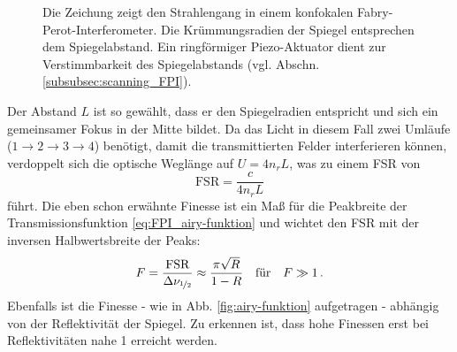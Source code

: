 \begin{figure}[h]
 	\centering
	\caption[FPI - konfokal]{Die Zeichung zeigt den Strahlengang in einem
	konfokalen Fabry-Perot-Interferometer. Die
	Krümmungsradien der Spiegel entsprechen dem
	Spiegelabstand. Ein ringförmiger Piezo-Aktuator dient zur
	Verstimmbarkeit des Spiegelabstands (vgl. Abschn.
	\ref{subsubsec:scanning_FPI}).}\label{fig:FPI_konfokal}
\end{figure}
Der Abstand $L$ ist so gewählt, dass er den Spiegelradien entspricht und sich
ein gemeinsamer Fokus in der Mitte bildet. Da das Licht
in diesem Fall zwei Umläufe ($1\rightarrow2\rightarrow3\rightarrow4$)
benötigt, damit die transmittierten Felder interferieren können,
verdoppelt sich die optische Weglänge auf $U=4n_rL$, was zu einem FSR von
\begin{equation}\label{eq:FPI_FSR_02}
	\text{FSR}=\frac{c}{4n_rL}
\end{equation}
führt. Die eben schon erwähnte Finesse ist ein Maß für die Peakbreite der
Transmissionsfunktion \eqref{eq:FPI_airy-funktion} und wichtet den FSR mit der
inversen Halbwertsbreite der Peaks:
\begin{equation}\label{eq:FPI_finesse}
	F=\frac{\text{FSR}}{\Delta\nu_{\nicefrac{1}{2}}}\approx\frac{\pi\sqrt{R}}{1-R}
	\quad\text{für}\quad F\gg1\,.
\end{equation}
Ebenfalls ist die Finesse - wie in Abb. \ref{fig:airy-funktion} aufgetragen
- abhängig von der Reflektivität der Spiegel. Zu erkennen ist, dass hohe
Finessen erst bei Reflektivitäten nahe 1 erreicht werden.

